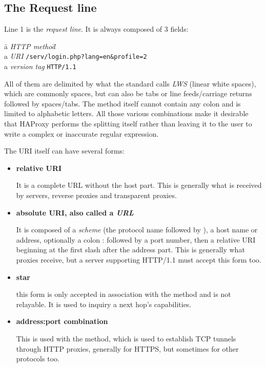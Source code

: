\subsection{The Request line}

Line 1 is the \emph{request line}. It is always composed of 3 fields:
\begin{tabbing}
\qquad \= {a \emph{HTTP method}}\qquad\=  \\
\> {a \emph{URI}}			\> \verb|/serv/login.php?lang=en&profile=2| \\
\> {a \emph{version tag}}	\> \verb|HTTP/1.1|
\end{tabbing}

All of them are delimited by what the standard calls \emph{LWS} (linear white spaces),
which are commonly spaces, but can also be tabs or line feeds\slash carriage returns
followed by spaces\slash tabs. The method itself cannot contain any colon \CHAR{:} and
is limited to alphabetic letters. All those various combinations make it
desirable that HAProxy performs the splitting itself rather than leaving it to
the user to write a complex or inaccurate regular expression.


The URI itself can have several forms:
\begin{itemize}
\item \textbf{relative URI}


	It is a complete URL without the host part. This is generally what is
	received by servers, reverse proxies and transparent proxies.

\item \textbf{absolute URI, also called a \emph{URL}}


	It is composed of a \emph{scheme} (the protocol name followed by \CHAR{://}), a host
	name or address, optionally a colon \CHAR: followed by a port number, then
	a relative URI beginning at the first slash \CHAR{\slash} after the address part.
	This is generally what proxies receive, but a server supporting HTTP/1.1
	must accept this form too.

\item \textbf{star}

	\CHAR{*}

    this form is only accepted in association with the 
    method and is not relayable. It is used to inquiry a next hop's
    capabilities.

\item \textbf{address:port combination}


    This is used with the  method, which is used to establish TCP
    tunnels through HTTP proxies, generally for HTTPS, but sometimes for
    other protocols too.
\end{itemize}

